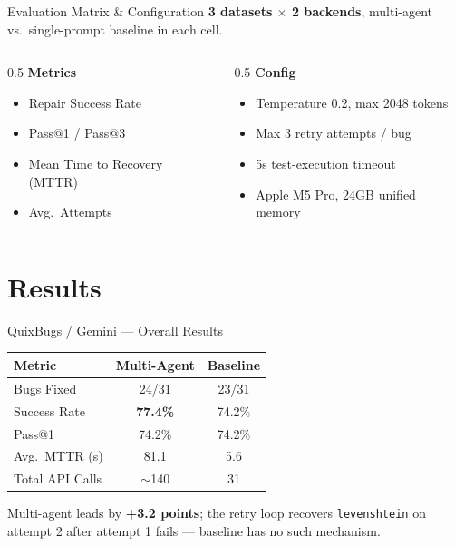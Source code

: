\documentclass[aspectratio=169]{beamer}
\begin{document}
\begin{frame}{Evaluation Matrix \& Configuration}
\textbf{3 datasets $\times$ 2 backends}, multi-agent vs.\ single-prompt baseline in each cell.
\vspace{6pt}
\begin{columns}
\begin{column}{0.5\textwidth}
\small
\textbf{Metrics}
\begin{itemize}
    \item Repair Success Rate
    \item Pass@1 / Pass@3
    \item Mean Time to Recovery (MTTR)
    \item Avg.\ Attempts
\end{itemize}
\end{column}
\begin{column}{0.5\textwidth}
\small
\textbf{Config}
\begin{itemize}
    \item Temperature 0.2, max 2048 tokens
    \item Max 3 retry attempts / bug
    \item 5s test-execution timeout
    \item Apple M5 Pro, 24GB unified memory
\end{itemize}
\end{column}
\end{columns}
\end{frame}

\section{Results}

\begin{frame}{QuixBugs / Gemini --- Overall Results}
\begin{table}
\centering
\begin{tabular}{lcc}
\toprule
\textbf{Metric} & \textbf{Multi-Agent} & \textbf{Baseline} \\
\midrule
Bugs Fixed & 24/31 & 23/31 \\
Success Rate & \textbf{77.4\%} & 74.2\% \\
Pass@1 & 74.2\% & 74.2\% \\
Avg.\ MTTR (s) & 81.1 & 5.6 \\
Total API Calls & $\sim$140 & 31 \\
\bottomrule
\end{tabular}
\end{table}
Multi-agent leads by \textbf{+3.2 points}; the retry loop recovers \texttt{levenshtein} on attempt 2 after attempt 1 fails --- baseline has no such mechanism.
\end{frame}
\end{document}
